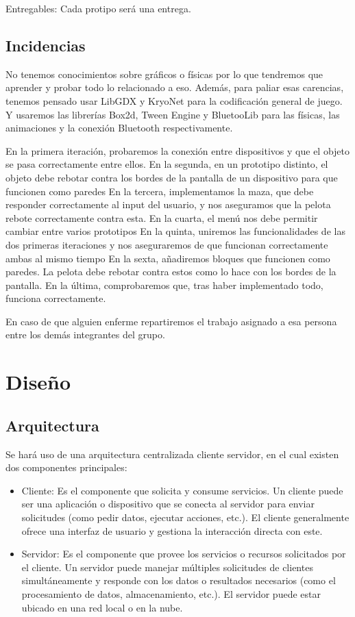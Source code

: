 \documentclass[a4paper,openright,12pt]{article}
\begin{document}
Entregables:
Cada protipo será una entrega.

\subsection{Incidencias}
No tenemos conocimientos sobre gráficos o físicas por lo que tendremos que aprender y probar todo lo relacionado a eso. Además, para paliar esas carencias, tenemos pensado usar LibGDX\cite{misc-libGDX} y KryoNet\cite{misc-kryonetl} para la codificación general de juego. Y usaremos las librerías Box2d\cite{misc-box2d}, Tween Engine\cite{misc-tween} y BluetooLib\cite{misc-bluetooth} para las físicas, las animaciones y la conexión Bluetooth respectivamente.
\par
En la primera iteración, probaremos la conexión entre dispositivos y que el objeto se pasa correctamente entre ellos.
En la segunda, en un prototipo distinto, el objeto debe rebotar contra los bordes de la pantalla de un dispositivo para que funcionen como paredes
En la tercera, implementamos la maza, que debe responder correctamente al input del usuario, y nos aseguramos que la pelota rebote correctamente contra esta.
En la cuarta, el menú nos debe permitir cambiar entre varios prototipos
En la quinta, uniremos las funcionalidades de las dos primeras iteraciones y nos aseguraremos de que funcionan correctamente ambas al mismo tiempo
En la sexta, añadiremos bloques que funcionen como paredes. La pelota debe rebotar contra estos como lo hace con los bordes de la pantalla.
En la última, comprobaremos que, tras haber implementado todo, funciona correctamente.
\par
En caso de que alguien enferme repartiremos el trabajo asignado a esa persona entre los demás integrantes del grupo.

\section{Diseño}
\subsection{Arquitectura}
Se hará uso de una arquitectura centralizada cliente servidor, en el cual existen dos componentes principales:
\begin{itemize}
    \item Cliente: Es el componente que solicita y consume servicios. Un cliente puede ser una aplicación o dispositivo que se conecta al servidor para enviar solicitudes (como pedir datos, ejecutar acciones, etc.). El cliente generalmente ofrece una interfaz de usuario y gestiona la interacción directa con este.
    \item Servidor: Es el componente que provee los servicios o recursos solicitados por el cliente. Un servidor puede manejar múltiples solicitudes de clientes simultáneamente y responde con los datos o resultados necesarios (como el procesamiento de datos, almacenamiento, etc.). El servidor puede estar ubicado en una red local o en la nube.
\end{itemize}
\end{document}

